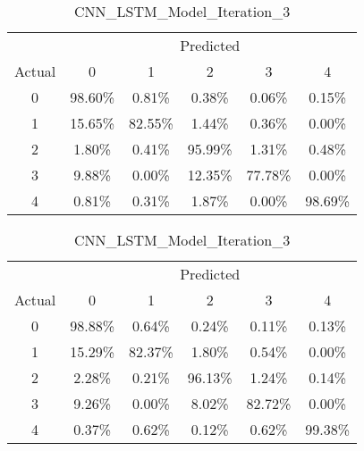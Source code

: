 \begin{table}[ht]
    \centering
    \caption{Normalized Confusion Matrices in Percent}
    \label{tab:conf_matrices_it3}
    \begin{minipage}{0.32\textwidth}
        \caption*{CNN\_Model\_Iteration\_3}
        \begin{tabular}{cccccc}
            \toprule
            & \multicolumn{5}{c}{Predicted} \\
            \cmidrule(lr){2-6}
            Actual & 0 & 1 & 2 & 3 & 4 \\
            \midrule
            0 & 98.60\% & 0.81\% & 0.38\% & 0.06\% & 0.15\% \\
            1 & 15.65\% & 82.55\% & 1.44\% & 0.36\% & 0.00\% \\
            2 & 1.80\%  & 0.41\% & 95.99\% & 1.31\% & 0.48\% \\
            3 & 9.88\%  & 0.00\% & 12.35\%& 77.78\% & 0.00\% \\
            4 & 0.81\%  & 0.31\% & 1.87\% & 0.00\% & 98.69\% \\
            \bottomrule
        \end{tabular}
    \end{minipage}
    \hfill
    \begin{minipage}{0.32\textwidth}
        \caption*{CNN\_LSTM\_Model\_Iteration\_3}
        \begin{tabular}{cccccc}
            \toprule
            & \multicolumn{5}{c}{Predicted} \\
            \cmidrule(lr){2-6}
            Actual & 0 & 1 & 2 & 3 & 4 \\
            \midrule
            0 & 98.88\% & 0.64\% & 0.24\% & 0.11\% & 0.13\% \\
            1 & 15.29\% & 82.37\% & 1.80\% & 0.54\% & 0.00\% \\
            2 & 2.28\%  & 0.21\% & 96.13\% & 1.24\% & 0.14\% \\
            3 & 9.26\%  & 0.00\% & 8.02\%  & 82.72\% & 0.00\% \\
            4 & 0.37\%  & 0.62\% & 0.12\%  & 0.62\% & 99.38\% \\
            \bottomrule
        \end{tabular}
    \end{minipage}
    \hfill
    \begin{minipage}{0.32\textwidth}

\end{minipage}
\end{table}
